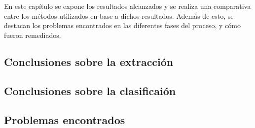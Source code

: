 \chapter{\ChapterThree{}}

En este capítulo se expone los resultados alcanzados y se realiza una comparativa entre los métodos utilizados en base a dichos resultados.
%
Además de esto, se destacan los problemas encontrados en las diferentes fases del proceso, y cómo fueron remediados.

\section{Conclusiones sobre la extracción}


\section{Conclusiones sobre la clasificaión}


\section{Problemas encontrados}
